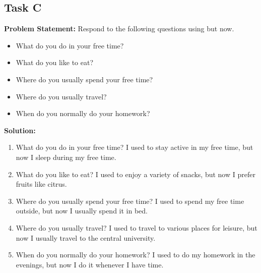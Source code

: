 \documentclass[a4paper,12pt]{article}
\begin{document}
\vspace{1cm}

\subsection{Task C}
\textbf{Problem Statement:}
     Respond to the following questions using but now.
    \begin{itemize}
        \item What do you do in your free time?
        \item What do you like to eat?
        \item Where do you usually spend your free time?
        \item Where do you usually travel?
        \item When do you normally do your homework?
    \end{itemize}

\textbf{Solution:}
\begin{enumerate}
    \item What do you do in your free time?
        I used to stay active in my free time, but now I sleep during my free time.

    \item What do you like to eat?
        I used to enjoy a variety of snacks, but now I prefer fruits like citrus.

    \item Where do you usually spend your free time?
        I used to spend my free time outside, but now I usually spend it in bed.

    \item Where do you usually travel?
        I used to travel to various places for leisure, but now I usually travel to the central university.

    \item When do you normally do your homework?
        I used to do my homework in the evenings, but now I do it whenever I have time.
\end{enumerate}
\vspace{1cm}
\end{document}
